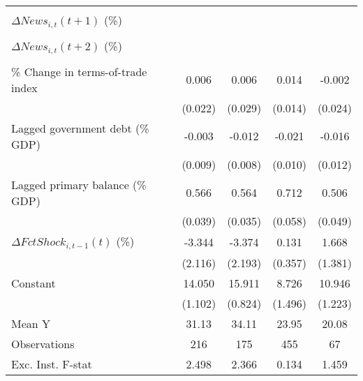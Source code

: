 {\begin{tabular}{l*{4}{c}}
                    &                     &                     &                     &                     \\
\addlinespace
$ \Delta News_{i,t}(t+1)$ (\%)&                     &                     &                     &                     \\
                    &                     &                     &                     &                     \\
\addlinespace
$ \Delta News_{i,t}(t+2)$ (\%)&                     &                     &                     &                     \\
                    &                     &                     &                     &                     \\
\addlinespace
\% Change in terms-of-trade index&       0.006         &       0.006         &       0.014         &      -0.002         \\
                    &     (0.022)         &     (0.029)         &     (0.014)         &     (0.024)         \\
\addlinespace
Lagged government debt (\% GDP)&      -0.003         &      -0.012         &      -0.021\sym{**} &      -0.016         \\
                    &     (0.009)         &     (0.008)         &     (0.010)         &     (0.012)         \\
\addlinespace
Lagged primary balance (\% GDP)&       0.566\sym{***}&       0.564\sym{***}&       0.712\sym{***}&       0.506\sym{***}\\
                    &     (0.039)         &     (0.035)         &     (0.058)         &     (0.049)         \\
\addlinespace
$ \Delta FctShock_{i,t-1}(t)$ (\%)&      -3.344         &      -3.374         &       0.131         &       1.668         \\
                    &     (2.116)         &     (2.193)         &     (0.357)         &     (1.381)         \\
\addlinespace
Constant            &      14.050\sym{***}&      15.911\sym{***}&       8.726\sym{***}&      10.946\sym{***}\\
                    &     (1.102)         &     (0.824)         &     (1.496)         &     (1.223)         \\
\midrule
Mean Y              &       31.13         &       34.11         &       23.95         &       20.08         \\
Observations        &         216         &         175         &         455         &          67         \\
Exc. Inst. F-stat   &       2.498         &       2.366         &       0.134         &       1.459         \\
\bottomrule
\end{tabular}
}
